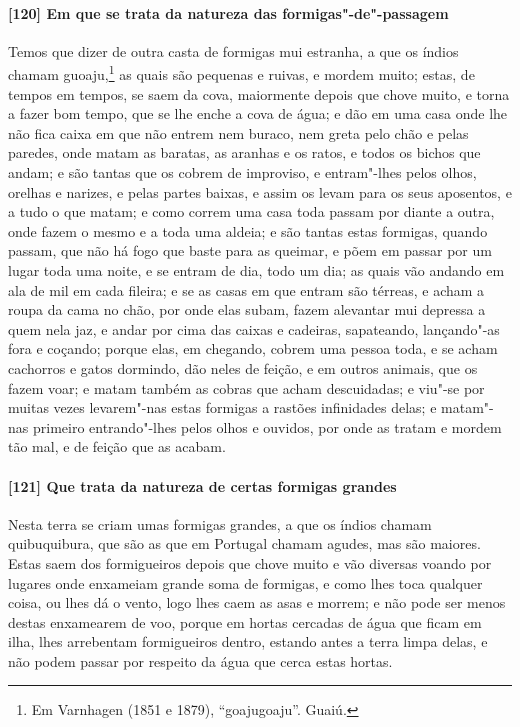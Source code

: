 \begin{linenumbers}
\paragraph{[120] Em que se trata da natureza das formigas"-de"-passagem}\quad
Temos que dizer de outra casta de formigas mui estranha, a que os índios chamam
guoaju,\footnote{ Em Varnhagen (1851 e 1879), ``goajugoaju''. Guaiú.} as quais são
pequenas e ruivas, e mordem muito; estas, de tempos em tempos, se saem da cova, maiormente
depois que chove muito, e torna a fazer bom tempo, que se lhe enche a cova de água; e dão
em uma casa onde lhe não fica caixa em que não entrem nem buraco, nem greta pelo chão e
pelas paredes, onde matam as baratas, as aranhas e os ratos, e todos os bichos que andam;
e são tantas que os cobrem de improviso, e entram"-lhes pelos olhos, orelhas e narizes, e
pelas partes baixas, e assim os levam para os seus aposentos, e a tudo o que matam; e como
correm uma casa toda passam por diante a outra, onde fazem o mesmo e a toda uma aldeia; e
são tantas estas formigas, quando passam, que não há fogo que baste para as queimar, e
põem em passar por um lugar toda uma noite, e se entram de dia, todo um dia; as quais vão
andando em ala de mil em cada fileira; e se as casas em que entram são térreas, e acham a
roupa da cama no chão, por onde elas subam, fazem alevantar mui depressa a quem nela jaz,
e andar por cima das caixas e cadeiras, sapateando, lançando"-as fora e coçando; porque
elas, em chegando, cobrem uma pessoa toda, e se acham cachorros e gatos dormindo, dão
neles de feição, e em outros animais, que os fazem voar; e matam também as cobras que
acham descuidadas; e viu"-se por muitas vezes levarem"-nas estas formigas a rastões
infinidades delas; e matam"-nas primeiro entrando"-lhes pelos olhos e ouvidos, por onde as
tratam e mordem tão mal, e de feição que as acabam.

\paragraph{[121] Que trata da natureza de certas formigas grandes}\quad
Nesta terra se criam umas formigas grandes, a que os índios chamam quibuquibura, que são
as que em Portugal chamam agudes, mas são maiores. Estas saem dos formigueiros depois que
chove muito e vão diversas voando por lugares onde enxameiam grande soma de formigas, e
como lhes toca qualquer coisa, ou lhes dá o vento, logo lhes caem as asas e morrem; e não
pode ser menos destas enxamearem de voo, porque em hortas cercadas de água que ficam em
ilha, lhes arrebentam formigueiros dentro, estando antes a terra limpa delas, e não podem
passar por respeito da água que cerca estas hortas.


\end{linenumbers}
